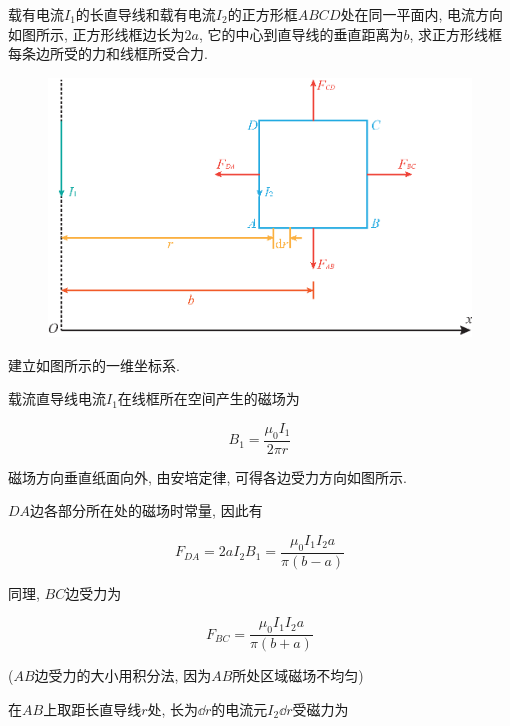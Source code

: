 \begin{example}
	载有电流$I_1$的长直导线和载有电流$I_2$的正方形框$ABCD$处在同一平面内, 电流方向如图所示, 正方形线框边长为$2a$, 它的中心到直导线的垂直距离为$b$, 求正方形线框每条边所受的力和线框所受合力. 
	
	\begin{figure}[H]
		\centering
		\includegraphics[scale=0.65]{C8-fig15.eps}
	\end{figure}
	
	\begin{solution}
		
		建立如图所示的一维坐标系.
		
		载流直导线电流$I_1$在线框所在空间产生的磁场为
		
		\begin{equation*}
			B_1 = \dfrac{\mu_0 I_1}{2 \pi r}
		\end{equation*}
		
		磁场方向垂直纸面向外, 由安培定律, 可得各边受力方向如图所示. 
		
		$DA$边各部分所在处的磁场时常量, 因此有
		
		\begin{equation*}
			F_{DA} = 2aI_2 B_1 = \dfrac{\mu_0 I_1 I_2 a}{\pi (b - a)}
		\end{equation*}
		
		同理, $BC$边受力为
		
		\begin{equation*}
			F_{BC} = \dfrac{\mu_0 I_1 I_2 a}{\pi (b + a)}
		\end{equation*}
		
		($AB$边受力的大小用积分法, 因为$AB$所处区域磁场不均匀)
		
		在$AB$上取距长直导线$r$处, 长为$\dd{r}$的电流元$I_2\dd{r}$受磁力为
		

\end{solution}
\end{example}
